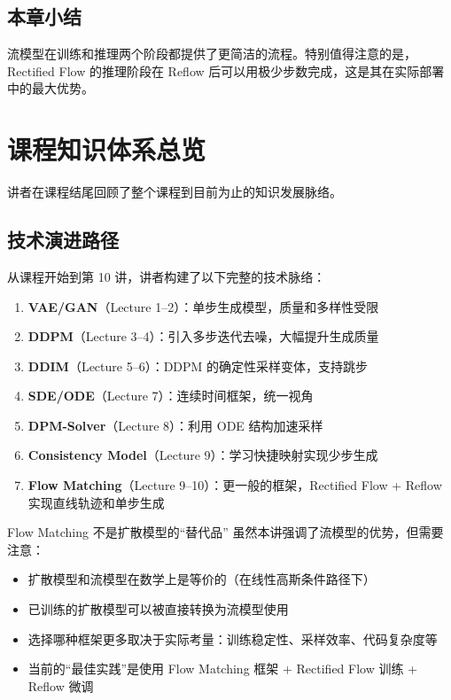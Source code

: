 \documentclass[a4paper]{article}
\begin{document}
\subsection{本章小结}

流模型在训练和推理两个阶段都提供了更简洁的流程。特别值得注意的是，Rectified Flow 的推理阶段在 Reflow 后可以用极少步数完成，这是其在实际部署中的最大优势。

\section{课程知识体系总览}

讲者在课程结尾回顾了整个课程到目前为止的知识发展脉络。

\subsection{技术演进路径}

从课程开始到第 10 讲，讲者构建了以下完整的技术脉络：

\begin{enumerate}
    \item \textbf{VAE/GAN}（Lecture 1--2）：单步生成模型，质量和多样性受限
    \item \textbf{DDPM}（Lecture 3--4）：引入多步迭代去噪，大幅提升生成质量
    \item \textbf{DDIM}（Lecture 5--6）：DDPM 的确定性采样变体，支持跳步
    \item \textbf{SDE/ODE}（Lecture 7）：连续时间框架，统一视角
    \item \textbf{DPM-Solver}（Lecture 8）：利用 ODE 结构加速采样
    \item \textbf{Consistency Model}（Lecture 9）：学习快捷映射实现少步生成
    \item \textbf{Flow Matching}（Lecture 9--10）：更一般的框架，Rectified Flow + Reflow 实现直线轨迹和单步生成
\end{enumerate}

\begin{warningbox}{Flow Matching 不是扩散模型的``替代品''}
虽然本讲强调了流模型的优势，但需要注意：
\begin{itemize}
    \item 扩散模型和流模型在数学上是等价的（在线性高斯条件路径下）
    \item 已训练的扩散模型可以被直接转换为流模型使用
    \item 选择哪种框架更多取决于实际考量：训练稳定性、采样效率、代码复杂度等
    \item 当前的``最佳实践''是使用 Flow Matching 框架 + Rectified Flow 训练 + Reflow 微调
\end{itemize}
\end{warningbox}
\end{document}
